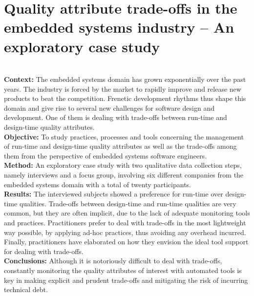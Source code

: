 \setlength{\headheight}{1.2cm}
\renewcommand{\publ}{\flushleft\footnotesize{Based on:\\[0.1cm]
		\textit{D. Sas, P. Avgeriou, Quality attribute trade-offs in the embedded systems industry: an exploratory case study. Software Quality Journal 28, 505-534 (2020). https://doi.org/10.1007/s11219-019-09478-x} \\[0.1cm]
}}

\chapter{Quality attribute trade-offs in the embedded systems industry -- An exploratory case study}
\label{chap:5}


\begin{Abstract}
    \textbf{\\Context: } The embedded systems domain has grown exponentially over the past years. The industry is forced by the market to rapidly improve and release new products to beat the competition. Frenetic development rhythms thus shape this domain and give rise to several new challenges for software design and development. One of them is dealing with trade-offs between run-time and design-time quality attributes.
    \\\textbf{Objective: } To study practices, processes and tools concerning the management of run-time and design-time quality attributes as well as the trade-offs among them from the perspective of embedded systems software engineers.
    \\\textbf{Method: } An exploratory case study with two qualitative data collection steps, namely interviews and a focus group, involving six different companies from the embedded systems domain with a total of twenty participants.
    \\\textbf{Results: } The interviewed subjects showed a preference for run-time over design-time qualities. Trade-offs between design-time and run-time qualities are very common, but they are often implicit, due to the lack of adequate monitoring tools and practices.
    Practitioners prefer to deal with trade-offs in the most lightweight way possible, by applying ad-hoc practices, thus avoiding any overhead incurred.
    Finally, practitioners have elaborated on how they envision the ideal tool support for dealing with trade-offs.
    \\\textbf{Conclusions: }
    Although it is notoriously difficult to deal with trade-offs, constantly monitoring the quality attributes of interest with automated tools is key in making explicit and prudent trade-offs and mitigating the risk of incurring technical debt.
\end{Abstract}

